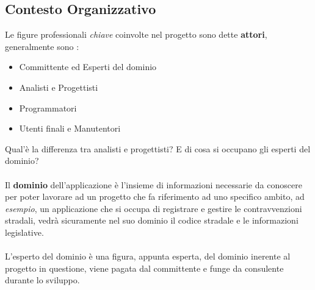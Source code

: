\documentclass[12pt, letterpaper]{article}
\newcommand{\acc}{\\\hphantom{}\\}
\begin{document}
\subsection{Contesto Organizzativo}
Le figure professionali \textit{chiave} coinvolte nel progetto sono dette \textbf{attori}, generalmente
sono :\begin{itemize}
    \item Committente ed Esperti del dominio 
    \item Analisti e Progettisti
    \item Programmatori 
    \item Utenti finali e Manutentori
\end{itemize}
Qual'è la differenza tra analisti e progettisti? E di cosa si occupano gli esperti del dominio?\acc 
Il \textbf{dominio} dell'applicazione è l'insieme di informazioni necessarie da conoscere per poter lavorare 
ad un progetto che fa riferimento ad uno specifico ambito, ad \textit{esempio}, un applicazione che si occupa 
di registrare e gestire le contravvenzioni stradali, vedrà sicuramente nel suo dominio il codice stradale 
e le informazioni legislative. \acc L'esperto del dominio è una figura, appunta esperta, del dominio inerente 
al progetto in questione, viene pagata dal committente e funge da consulente durante lo sviluppo.
\end{document}
